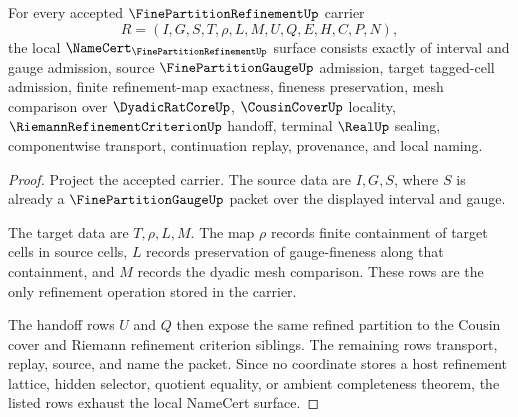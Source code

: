 \begin{theorem}
\label{thm:fine-partition-refinement-namecert-obligations}
For every accepted $\FinePartitionRefinementUp$ carrier
$$
R=(I,G,S,T,\rho,L,M,U,Q,E,H,C,P,N),
$$
the local $\NameCert_{\FinePartitionRefinementUp}$ surface consists exactly of interval and gauge admission, source $\FinePartitionGaugeUp$ admission, target tagged-cell admission, finite refinement-map exactness, fineness preservation, mesh comparison over $\DyadicRatCoreUp$, $\CousinCoverUp$ locality, $\RiemannRefinementCriterionUp$ handoff, terminal $\RealUp$ sealing, componentwise transport, continuation replay, provenance, and local naming.
\end{theorem}
\begin{proof}
Project the accepted carrier. The source data are $I,G,S$, where $S$ is already a $\FinePartitionGaugeUp$ packet over the displayed interval and gauge.

The target data are $T,\rho,L,M$. The map $\rho$ records finite containment of target cells in source cells, $L$ records preservation of gauge-fineness along that containment, and $M$ records the dyadic mesh comparison. These rows are the only refinement operation stored in the carrier.

The handoff rows $U$ and $Q$ then expose the same refined partition to the Cousin cover and Riemann refinement criterion siblings. The remaining rows transport, replay, source, and name the packet. Since no coordinate stores a host refinement lattice, hidden selector, quotient equality, or ambient completeness theorem, the listed rows exhaust the local NameCert surface.
\end{proof}

